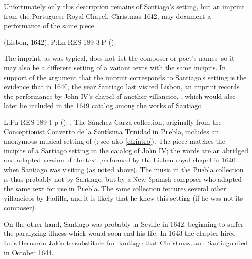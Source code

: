 Unfortunately only this description remains of Santiago's setting, but an
imprint from the Portuguese Royal Chapel, Christmas 1642, may document a
performance of the same piece.%
\begin{Footnote}
     (Lisbon, 1642), P:Ln RES-189-3-P ().
\end{Footnote}
The imprint, as was typical, does not list the composer or poet's names, so it
may also be a different setting of a variant texts with the same incipits.
In support of the argument that the imprint corresponds to Santiago's setting is
the evidence that in 1640, the year Santiago last visited Lisbon, an imprint
records the performance by John IV's chapel of another villancico, , which would also later be included in the 1649 catalog
among the works of Santiago.%
\begin{Footnote}
    L:Pn RES-189-1-p (); 
    \autocite[caixão 26, ]{JohnIV:Catalog}.  
    The Sánchez Garza collection, originally from the Conceptionist Convento de
    la Santísima Trinidad in Puebla, includes an anonymous musical setting of
     (; see also
    \cref{ch:intro}).
    The piece matches the incipits of a Santiago setting in the catalog of John
    IV; the words are an abridged and adapted version of the text performed by
    the Lisbon royal chapel in 1640 when Santiago was visiting (as noted above).
    The music in the Puebla collection is thus probably not by Santiago, but by
    a New Spanish composer who adapted the same text for use in Puebla.
    The same collection features several other villancicos by Padilla, and it is
    likely that he knew this setting (if he was not its composer).
    \end{Footnote}
On the other hand, Santiago was probably in Seville in 1642, beginning to suffer
the paralyzing illness which would soon end his life.
In 1643 the chapter hired Luis Bernardo Jalón to substitute for Santiago that
Christmas, and Santiago died in October 1644.%
    \Autocite{Ezquerro:JalonLB}

